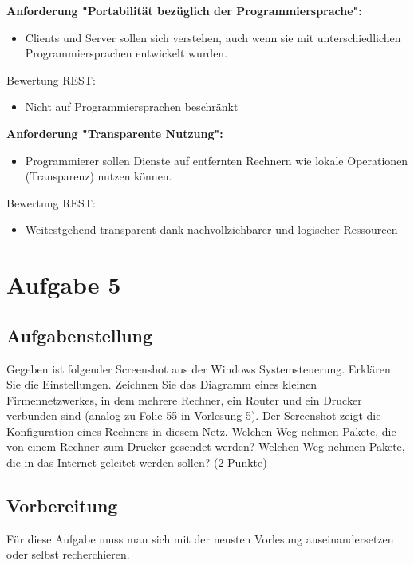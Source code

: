 \textbf{Anforderung "Portabilität bezüglich der Programmiersprache":}
\begin{itemize}
	\item Clients und Server sollen sich verstehen, auch wenn sie mit unterschiedlichen Programmiersprachen entwickelt wurden.
\end{itemize}
Bewertung REST:
\begin{itemize}
	\item Nicht auf Programmiersprachen beschränkt
\end{itemize}

\textbf{Anforderung "Transparente Nutzung":}
\begin{itemize}
	\item Programmierer sollen Dienste auf entfernten Rechnern wie lokale Operationen (Transparenz) nutzen können.
\end{itemize}
Bewertung REST:
\begin{itemize}
	\item Weitestgehend transparent dank nachvollziehbarer und logischer Ressourcen
\end{itemize}

\section{Aufgabe 5} 

\subsection{Aufgabenstellung}
Gegeben ist folgender Screenshot aus der Windows Systemsteuerung. Erklären Sie die Einstellungen. Zeichnen Sie das Diagramm eines kleinen Firmennetzwerkes, in dem mehrere Rechner, ein Router und ein Drucker verbunden sind (analog zu Folie 55 in Vorlesung 5). Der Screenshot zeigt die Konfiguration eines Rechners in diesem Netz. Welchen Weg nehmen Pakete, die von einem Rechner zum Drucker gesendet werden? Welchen Weg nehmen Pakete, die in das Internet geleitet werden sollen? (2 Punkte)

\subsection{Vorbereitung}
Für diese Aufgabe muss man sich mit der neusten Vorlesung auseinandersetzen oder selbst recherchieren.

